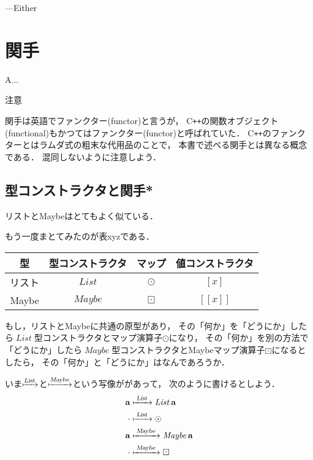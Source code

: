 \documentclass[a5paper,draft]{jsbook}
\def\[{\left[\!\left[}
\def\]{\right]\!\right]}
\newcommand{\programminglanguage}[1]{\textsf{#1}}
\newcommand{\cxx}{\programminglanguage{C}\texttt{++}}
\newenvironment{leader}{\begingroup}{\endgroup}
\newenvironment{caution}{\begin{boxnote}\begin{center}注意\end{center}}{\end{boxnote}}
\newcommand{\mathTypeParameter}[1]{\mathbf{#1}}
\newcommand{\mathFunctor}[1]{\textsl{#1}} %
\newcommand{\mathTypeConstructor}[1]{\mathit{#1}} %
\newcommand{\mathListWith}[1]{\left[#1\right]}
\newcommand{\mathMaybeWith}[1]{\[#1\]}
\newcommand{\mathPureWith}[1]{\left\langle#1\right\rangle}
\DeclareMathOperator{\mathList}{\mathTypeConstructor{List}}
\DeclareMathOperator{\mathMaybe}{\mathTypeConstructor{Maybe}}
\DeclareMathOperator{\mathListFunctor}{\mathFunctor{List}}
\DeclareMathOperator{\mathMaybeFunctor}{\mathFunctor{Maybe}}
\newcommand{\mathGeneralMap}{\mathbin{\cdot}}
\newcommand{\mathMap}{\mathbin{\odot}}
\newcommand{\mathMaybeMap}{\mathbin{\boxdot}}
\begin{document}
---Either

\chapter{関手}
\label{ch:functor}

\begin{leader}
A...
\end{leader}

\begin{caution}
関手は英語でファンクター(functor)と言うが，
\cxx の関数オブジェクト(functional)もかつてはファンクター(functor)と呼ばれていた．
\cxx のファンクターとはラムダ式の粗末な代用品のことで，
本書で述べる関手とは異なる概念である．
混同しないように注意しよう．
\end{caution}


\section{型コンストラクタと関手*}

リストとMaybeはとてもよく似ている．

もう一度まとてみたのが表xyzである．

\begin{table}
\begin{center}
\begin{tabular}{||c|c|c|c||}\hline
型&型コンストラクタ&マップ&値コンストラクタ\\\hline\hline
リスト&$\mathList$&$\mathMap$&$\mathListWith{x}$\\
Maybe&$\mathMaybe$&$\mathMaybeMap$&$\mathMaybeWith{x}$\\\hline
\end{tabular}
\end{center}
\end{table}

もし，リストとMaybeに共通の原型があり，
その「何か」を「どうにか」したら$\mathList$型コンストラクタとマップ演算子$\mathMap$になり，
その「何か」を別の方法で「どうにか」したら$\mathMaybe$型コンストラクタとMaybeマップ演算子$\mathMaybeMap$になるとしたら，
その「何か」と「どうにか」はなんであろうか．

いま$\xmapsto{\mathListFunctor}$と$\xmapsto{\mathMaybeFunctor}$という写像ががあって，
次のように書けるとしよう．
\begin{align}
\mathTypeParameter{a}&\xmapsto{\;\mathListFunctor\;}\mathList\mathTypeParameter{a}\\
\mathGeneralMap&\xmapsto{\;\mathListFunctor\;}\mathMap\\
\mathTypeParameter{a}&\xmapsto{\;\mathMaybeFunctor\;}\mathMaybe\mathTypeParameter{a}\\
\mathGeneralMap&\xmapsto{\;\mathMaybeFunctor\;}\mathMaybeMap
\end{align}
\end{document}
